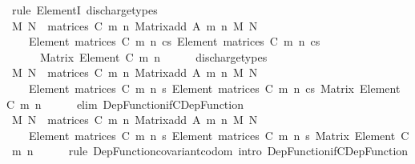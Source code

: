 \begin{isabellebody}
\ {\isacharparenleft}{\kern0pt}rule\ ElementI{\isacharparenright}{\kern0pt}\ discharge{\isacharunderscore}{\kern0pt}types\isanewline
\ \ \isamarkupfalse%
\ \isamarkupfalse%
\ {\isachardoublequoteopen}{\isasymlambda}M\ N\ {\isasymin}\ matrices\ C\ m\ n{\isachardot}{\kern0pt}\ Matrix{\isacharunderscore}{\kern0pt}add\ A\ m\ n\ M\ N\ {\isacharcolon}{\kern0pt}\isanewline
\ \ \ \ Element\ {\isacharparenleft}{\kern0pt}matrices\ C\ m\ n{\isacharparenright}{\kern0pt}\ {\isasymrightarrow}cs\ Element\ {\isacharparenleft}{\kern0pt}matrices\ C\ m\ n{\isacharparenright}{\kern0pt}\ {\isasymrightarrow}cs\isanewline
\ \ \ \ \ \ Matrix\ {\isacharparenleft}{\kern0pt}Element\ C{\isacharparenright}{\kern0pt}\ m\ n{\isachardoublequoteclose}\isanewline
\ \ \ \ \isamarkupfalse%
\ discharge{\isacharunderscore}{\kern0pt}types\isanewline
\ \ \isamarkupfalse%
\ \isamarkupfalse%
\ {\isachardoublequoteopen}{\isasymlambda}M\ N\ {\isasymin}\ matrices\ C\ m\ n{\isachardot}{\kern0pt}\ Matrix{\isacharunderscore}{\kern0pt}add\ A\ m\ n\ M\ N\ {\isacharcolon}{\kern0pt}\isanewline
\ \ \ \ Element\ {\isacharparenleft}{\kern0pt}matrices\ C\ m\ n{\isacharparenright}{\kern0pt}\ {\isasymrightarrow}s\ Element\ {\isacharparenleft}{\kern0pt}matrices\ C\ m\ n{\isacharparenright}{\kern0pt}\ {\isasymrightarrow}cs\ Matrix\ {\isacharparenleft}{\kern0pt}Element\ C{\isacharparenright}{\kern0pt}\ m\ n{\isachardoublequoteclose}\isanewline
\ \ \ \ \isamarkupfalse%
\ {\isacharparenleft}{\kern0pt}elim\ Dep{\isacharunderscore}{\kern0pt}Function{\isacharunderscore}{\kern0pt}if{\isacharunderscore}{\kern0pt}CDep{\isacharunderscore}{\kern0pt}Function{\isacharparenright}{\kern0pt}\isanewline
\ \ \isamarkupfalse%
\ \isamarkupfalse%
\ {\isachardoublequoteopen}{\isasymlambda}M\ N\ {\isasymin}\ matrices\ C\ m\ n{\isachardot}{\kern0pt}\ Matrix{\isacharunderscore}{\kern0pt}add\ A\ m\ n\ M\ N\ {\isacharcolon}{\kern0pt}\isanewline
\ \ \ \ Element\ {\isacharparenleft}{\kern0pt}matrices\ C\ m\ n{\isacharparenright}{\kern0pt}\ {\isasymrightarrow}s\ Element\ {\isacharparenleft}{\kern0pt}matrices\ C\ m\ n{\isacharparenright}{\kern0pt}\ {\isasymrightarrow}s\ Matrix\ {\isacharparenleft}{\kern0pt}Element\ C{\isacharparenright}{\kern0pt}\ m\ n{\isachardoublequoteclose}\isanewline
\ \ \ \ \isamarkupfalse%
\ {\isacharparenleft}{\kern0pt}rule\ Dep{\isacharunderscore}{\kern0pt}Function{\isacharunderscore}{\kern0pt}covariant{\isacharunderscore}{\kern0pt}codom{\isacharcomma}{\kern0pt}\ intro\ Dep{\isacharunderscore}{\kern0pt}Function{\isacharunderscore}{\kern0pt}if{\isacharunderscore}{\kern0pt}CDep{\isacharunderscore}{\kern0pt}Function{\isacharparenright}{\kern0pt}\isanewline

\end{isabellebody}
